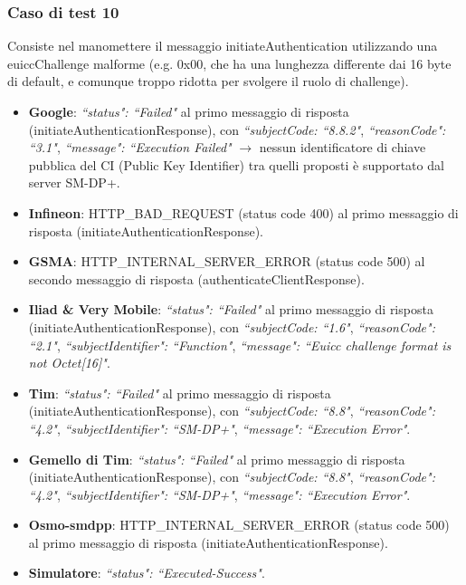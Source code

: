 \documentclass[10pt, oneside]{book}
\begin{document}
\subsubsection{Caso di test 10}
Consiste nel manomettere il messaggio initiateAuthentication utilizzando una euiccChallenge malforme (e.g. 0x00, che ha una lunghezza differente dai 16 byte di default, e comunque troppo ridotta per svolgere il ruolo di challenge).
\begin{itemize}
\item \textbf{Google}: \textit{``status": ``Failed"} al primo messaggio di risposta (initiateAuthenticationResponse), con \textit{``subjectCode: ``8.8.2"}, \textit{``reasonCode": ``3.1"}, \textit{``message": ``Execution Failed"} $\rightarrow$ nessun identificatore di chiave pubblica del CI (Public Key Identifier) tra quelli proposti è supportato dal server SM-DP+.
\item \textbf{Infineon}: HTTP\_BAD\_REQUEST (status code 400) al primo messaggio di risposta (initiateAuthenticationResponse).
\item \textbf{GSMA}: HTTP\_INTERNAL\_SERVER\_ERROR (status code 500) al secondo messaggio di risposta (authenticateClientResponse).
\item \textbf{Iliad \& Very Mobile}: \textit{``status": ``Failed"} al primo messaggio di risposta (initiateAuthenticationResponse), con \textit{``subjectCode: ``1.6"}, \textit{``reasonCode": ``2.1"}, \textit{``subjectIdentifier": ``Function"}, \textit{``message": ``Euicc challenge format is not Octet[16]"}.
\item \textbf{Tim}: \textit{``status": ``Failed"} al primo messaggio di risposta (initiateAuthenticationResponse), con \textit{``subjectCode: ``8.8"}, \textit{``reasonCode": ``4.2"}, \textit{``subjectIdentifier": ``SM-DP+"}, \textit{``message": ``Execution Error"}.
\item \textbf{Gemello di Tim}:  \textit{``status": ``Failed"} al primo messaggio di risposta (initiateAuthenticationResponse), con \textit{``subjectCode: ``8.8"}, \textit{``reasonCode": ``4.2"}, \textit{``subjectIdentifier": ``SM-DP+"}, \textit{``message": ``Execution Error"}.
\item \textbf{Osmo-smdpp}: HTTP\_INTERNAL\_SERVER\_ERROR (status code 500) al primo messaggio di risposta (initiateAuthenticationResponse).
\item \textbf{Simulatore}: \textit{``status": ``Executed-Success"}.
\end{itemize}
\end{document}
